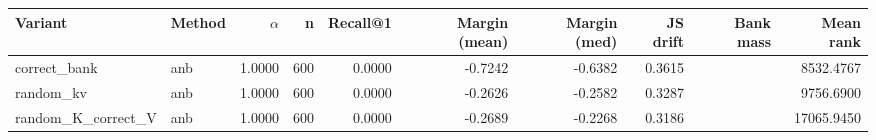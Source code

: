 \begin{tabular}{l l r r r r r r r r}
\toprule
Variant & Method & $\alpha$ & n & Recall@1 & Margin (mean) & Margin (med) & JS drift & Bank mass & Mean rank \\
\midrule
correct\_bank & anb & 1.0000 & 600 & 0.0000 & -0.7242 & -0.6382 & 0.3615 &  & 8532.4767 \\
random\_kv & anb & 1.0000 & 600 & 0.0000 & -0.2626 & -0.2582 & 0.3287 &  & 9756.6900 \\
random\_K\_correct\_V & anb & 1.0000 & 600 & 0.0000 & -0.2689 & -0.2268 & 0.3186 &  & 17065.9450 \\
\bottomrule
\end{tabular}
